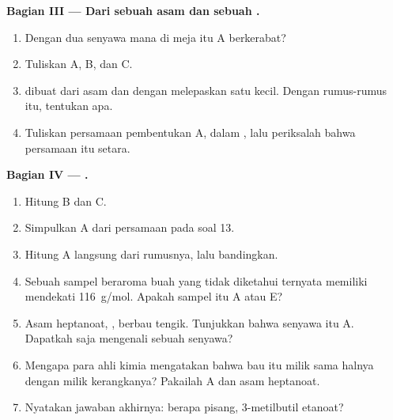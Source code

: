 \begin{problem}
\medskip
\noindent\textbf{Bagian III --- Dari sebuah asam dan sebuah .}
\begin{enumerate}[resume]
  \item Dengan dua senyawa mana di meja itu A berkerabat?
  \item Tuliskan  A, B, dan C.
  \item {} dibuat dari asam dan  dengan melepaskan satu
         kecil. Dengan rumus-rumus itu, tentukan  apa.
  \item Tuliskan persamaan pembentukan A, dalam , lalu
        periksalah bahwa persamaan itu setara.
\end{enumerate}

\medskip
\noindent\textbf{Bagian IV --- .}
\begin{enumerate}[resume]
  \item Hitung  B dan C.
  \item Simpulkan  A dari persamaan pada soal 13.
  \item Hitung  A langsung dari rumusnya, lalu bandingkan.
  \item Sebuah sampel beraroma buah yang tidak diketahui ternyata
        memiliki  mendekati \qty{116}{g/mol}. Apakah sampel itu
        A atau E?
  \item Asam heptanoat, , berbau tengik. Tunjukkan
        bahwa senyawa itu  A. Dapatkah  saja mengenali
        sebuah senyawa?
  \item Mengapa para ahli kimia mengatakan bahwa bau itu milik  sama halnya dengan milik kerangkanya? Pakailah A dan
        asam heptanoat.
  \item Nyatakan jawaban akhirnya: berapa   pisang,
        3-metilbutil etanoat?
\end{enumerate}
\end{problem}
